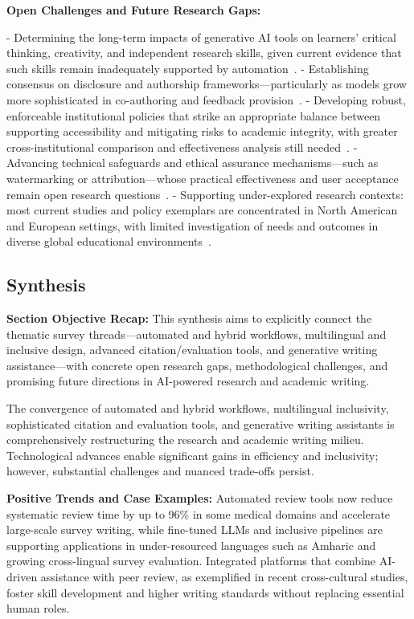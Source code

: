 \documentclass[sigconf]{acmart}
\begin{document}
\textbf{Open Challenges and Future Research Gaps:}

- Determining the long-term impacts of generative AI tools on learners’ critical thinking, creativity, and independent research skills, given current evidence that such skills remain inadequately supported by automation~\cite{ref109,ref110}.
- Establishing consensus on disclosure and authorship frameworks—particularly as models grow more sophisticated in co-authoring and feedback provision~\cite{ref109}.
- Developing robust, enforceable institutional policies that strike an appropriate balance between supporting accessibility and mitigating risks to academic integrity, with greater cross-institutional comparison and effectiveness analysis still needed~\cite{ref109,ref110}.
- Advancing technical safeguards and ethical assurance mechanisms—such as watermarking or attribution—whose practical effectiveness and user acceptance remain open research questions~\cite{ref104}.
- Supporting under-explored research contexts: most current studies and policy exemplars are concentrated in North American and European settings, with limited investigation of needs and outcomes in diverse global educational environments~\cite{ref110}.

\subsection{Synthesis}

\textbf{Section Objective Recap:} This synthesis aims to explicitly connect the thematic survey threads---automated and hybrid workflows, multilingual and inclusive design, advanced citation/evaluation tools, and generative writing assistance---with concrete open research gaps, methodological challenges, and promising future directions in AI-powered research and academic writing.

The convergence of automated and hybrid workflows, multilingual inclusivity, sophisticated citation and evaluation tools, and generative writing assistants is comprehensively restructuring the research and academic writing milieu. Technological advances enable significant gains in efficiency and inclusivity; however, substantial challenges and nuanced trade-offs persist.

\textbf{Positive Trends and Case Examples:}
Automated review tools now reduce systematic review time by up to 96\% in some medical domains and accelerate large-scale survey writing\cite{ref10,ref29,ref31,ref76}, while fine-tuned LLMs and inclusive pipelines are supporting applications in under-resourced languages such as Amharic and growing cross-lingual survey evaluation\cite{ref93,ref105}. Integrated platforms that combine AI-driven assistance with peer review, as exemplified in recent cross-cultural studies, foster skill development and higher writing standards without replacing essential human roles\cite{ref108,ref109,ref110}.
\end{document}
